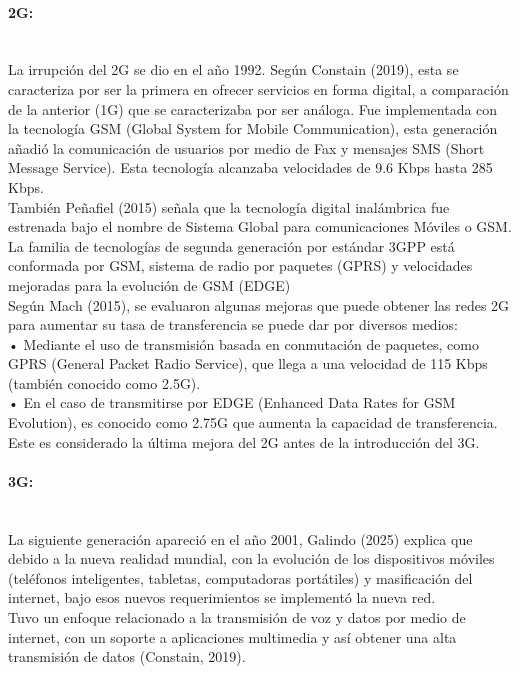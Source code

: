 \documentclass[12pt,a4paper]{article}
\begin{document}
	\paragraph*{2G:} \mbox{}\\
	
	La irrupción del 2G  se dio en el año 1992. Según Constain (2019), esta se caracteriza por ser la primera en ofrecer servicios en forma digital, a comparación de la anterior (1G) que se caracterizaba por ser análoga. Fue implementada con la tecnología GSM (Global System for Mobile Communication), esta generación añadió la comunicación de usuarios por medio de Fax y mensajes SMS (Short Message Service). Esta tecnología alcanzaba velocidades de 9.6 Kbps hasta 285 Kbps.\\

	También Peñafiel (2015)  señala que la tecnología  digital inalámbrica fue estrenada bajo el nombre de Sistema Global para comunicaciones Móviles o GSM. La familia de tecnologías de segunda generación por estándar 3GPP está conformada por GSM, sistema de radio por paquetes (GPRS) y velocidades mejoradas para la evolución de GSM (EDGE) \\
	
	Según Mach (2015), se evaluaron algunas mejoras que puede obtener las redes 2G para aumentar su tasa de transferencia se puede dar por diversos medios:\\
	• Mediante el uso de transmisión basada en conmutación de paquetes, como GPRS (General Packet Radio Service), que llega a una velocidad de 115 Kbps (también conocido como 2.5G). \\
	• En el caso de transmitirse por EDGE (Enhanced Data Rates for GSM Evolution), es conocido como 2.75G que aumenta la capacidad de transferencia. Este es considerado la última mejora del 2G antes de la introducción del 3G.
	
	\paragraph*{3G:} \mbox{}\\
	
	La siguiente generación apareció en el año 2001, Galindo (2025) explica que debido a la nueva realidad mundial, con la evolución de los dispositivos móviles (teléfonos inteligentes, tabletas, computadoras portátiles) y masificación del internet, bajo esos nuevos requerimientos se implementó la nueva red.\\
	
	Tuvo un enfoque relacionado a la transmisión de voz y datos por medio de internet, con un soporte a aplicaciones multimedia y así obtener una alta transmisión de datos (Constain, 2019).\\
	
\end{document}
